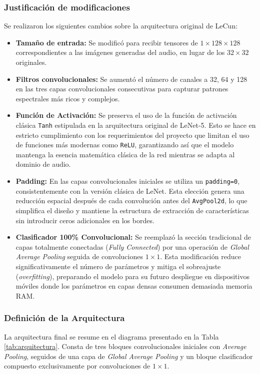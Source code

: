 \documentclass[conference]{IEEEtran}
\begin{document}
\subsubsection{Justificación de modificaciones}
Se realizaron los siguientes cambios sobre la arquitectura original de LeCun:
\begin{itemize}
    \item \textbf{Tamaño de entrada:} Se modificó para recibir tensores de $1 \times 128 \times 128$ correspondientes a las imágenes generadas del audio, en lugar de los $32 \times 32$ originales.
    \item \textbf{Filtros convolucionales:} Se aumentó el número de canales a 32, 64 y 128 en las tres capas convolucionales consecutivas para capturar patrones espectrales más ricos y complejos.
    \item \textbf{Función de Activación:} Se preserva el uso de la función de activación clásica \texttt{Tanh} estipulada en la arquitectura original de LeNet-5. Esto se hace en estricto cumplimiento con los requerimientos del proyecto que limitan el uso de funciones más modernas como \texttt{ReLU}, garantizando así que el modelo mantenga la esencia matemática clásica de la red mientras se adapta al dominio de audio.
    \item \textbf{Padding:} En las capas convolucionales iniciales se utiliza un \texttt{padding=0}, consistentemente con la versión clásica de LeNet. Esta elección genera una reducción espacial después de cada convolución antes del \texttt{AvgPool2d}, lo que simplifica el diseño y mantiene la estructura de extracción de características sin introducir ceros adicionales en los bordes.
    \item \textbf{Clasificador 100\% Convolucional:} Se reemplazó la sección tradicional de capas totalmente conectadas (\textit{Fully Connected}) por una operación de \textit{Global Average Pooling} seguida de convoluciones $1 \times 1$. Esta modificación reduce significativamente el número de parámetros y mitiga el sobreajuste (\textit{overfitting}), preparando el modelo para su futuro despliegue en dispositivos móviles donde los parámetros en capas densas consumen demasiada memoria RAM.
\end{itemize}

\subsubsection{Definición de la Arquitectura}
La arquitectura final se resume en el diagrama presentado en la Tabla \ref{tab:arquitectura}. Consta de tres bloques convolucionales iniciales con \textit{Average Pooling}, seguidos de una capa de \textit{Global Average Pooling} y un bloque clasificador compuesto exclusivamente por convoluciones de $1 \times 1$.
\end{document}
